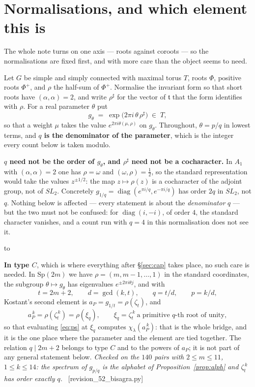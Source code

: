 \documentclass[11pt,a4paper]{article}
\theoremstyle{definition}
\newcommand{\Sp}{\mathrm{Sp}}
\newcommand{\ver}[1]{\unskip\penalty0\ \textcolor{azul}{\small\textsf{[#1]}}}
\newenvironment{keybox}
  {\par\vspace{9pt}\begin{lrbox}{\fichabox}%
   \begin{minipage}{0.90\textwidth}\vspace{7pt}\setlength{\parskip}{3pt}}
  {\vspace{7pt}\end{minipage}\end{lrbox}%
   \par\noindent\hbox to \textwidth{\hfill
   \textcolor{azul}{\rule[-\dp\fichabox]{3.2pt}{\dimexpr\ht\fichabox+\dp\fichabox\relax}}%
   \colorbox{fondoficha}{\usebox{\fichabox}}\hfill}%
   \par\vspace{9pt}}
\begin{document}
\section{Normalisations, and which element this is}\label{sec:norm}

The whole note turns on one axis --- roots against coroots --- so the normalisations are fixed
first, and with more care than the object seems to need.

Let $G$ be simple and simply connected with maximal torus $T$, roots $\Phi$, positive roots
$\Phi^+$, and $\rho$ the half-sum of $\Phi^+$. Normalise the invariant form so that short roots have
$(\alpha,\alpha)=2$, and write $\rho^\sharp$ for the vector of $\mathfrak t$ that the form
identifies with $\rho$. For a real parameter $\theta$ put
\begin{equation}\label{eq:gtheta}
g_\theta \;=\; \exp\bigl(2\pi i\,\theta\,\rho^\sharp\bigr)\;\in\;T ,
\end{equation}
so that a weight $\mu$ takes the value $e^{2\pi i\theta(\mu,\rho)}$ on $g_\theta$. Throughout,
$\theta=p/q$ in lowest terms, and \textbf{$q$ is the denominator of the parameter}, which is the
integer every count below is taken modulo.

\begin{keybox}
\textbf{$q$ need not be the order of $g_\theta$, and $\rho^\sharp$ need not be a cocharacter.} In
$A_1$ with $(\alpha,\alpha)=2$ one has $\rho=\omega$ and $(\omega,\rho)=\tfrac12$, so the standard
representation would take the values $z^{\pm1/2}$: the map $z\mapsto\rho(z)$ is a cocharacter of the
adjoint group, not of $SL_2$. Concretely $g_{1/q}=\operatorname{diag}(e^{\pi i/q},e^{-\pi i/q})$ has
order $2q$ in $SL_2$, not $q$. Nothing below is affected --- every statement is about the
\emph{denominator} $q$ --- but the two must not be confused: for
$\operatorname{diag}(i,-i)$, of order $4$, the standard character vanishes, and a count run with
$q=4$ in this normalisation does not see it.
\end{keybox}

\noindent \textbf{In type $C$}, which is where everything after \S\ref{sec:cap} takes place, no such
care is needed. In $\Sp(2m)$ we have $\rho=(m,m-1,\dots,1)$ in the standard coordinates, the
subgroup $\theta\mapsto g_\theta$ has eigenvalues $e^{\pm2\pi i\theta j}$, and with
\[
t=2m+2,\qquad d=\gcd(k,t),\qquad q=t/d,\qquad p=k/d,
\]
Kostant's second element is $a_P=g_{1/t}=\rho(\zeta_t)$, and
\[
a_P^{\,k}=\rho(\zeta_t^{\,k})=\rho(\xi_q),\qquad \xi_q=\zeta_t^{\,k}\ \text{a primitive $q$-th root of
unity},
\]
so that evaluating \eqref{eq:ps} at $\xi_q$ computes $\chi_\lambda(a_P^{\,k})$: that is the whole
bridge, and it is the one place where the parameter and the element are tied together. The relation
$q\mid 2m+2$ belongs to type $C$ and to the powers of $a_P$; it is not part of any general
statement below. \emph{Checked on the $140$ pairs with $2\le m\le11$, $1\le k\le14$: the spectrum
of $g_{p/q}$ is the alphabet of Proposition~\ref{prop:alph} and $\zeta_t^{\,k}$ has order exactly
$q$.} \ver{revision\_52\_bisagra.py}
\end{document}
